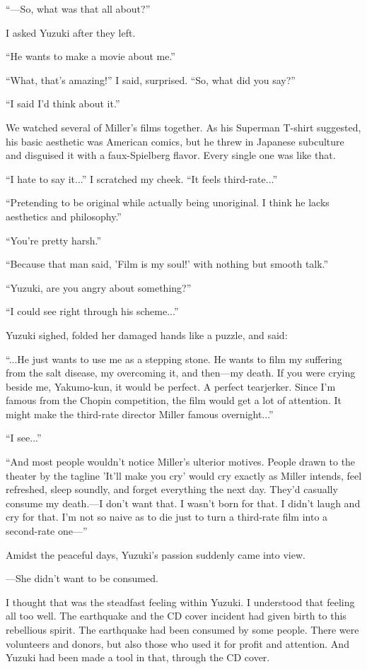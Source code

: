 \documentclass[
    a4paper,
    12pt,
    twoside,
    openany,
    UTF8,
    fontset=windows
]{ctexbook}
\begin{document}
``---So, what was that all about?''

I asked Yuzuki after they left.

``He wants to make a movie about me.''

``What, that's amazing!'' I said, surprised. ``So, what did you say?''

``I said I'd think about it.''

We watched several of Miller's films together. As his Superman T-shirt suggested, his basic aesthetic was American comics, but he threw in Japanese subculture and disguised it with a faux-Spielberg flavor. Every single one was like that.

``I hate to say it...'' I scratched my cheek. ``It feels third-rate...''

``Pretending to be original while actually being unoriginal. I think he lacks aesthetics and philosophy.''

``You're pretty harsh.''

``Because that man said, 'Film is my soul!' with nothing but smooth talk.''

``Yuzuki, are you angry about something?''

``I could see right through his scheme...''

Yuzuki sighed, folded her damaged hands like a puzzle, and said:

``...He just wants to use me as a stepping stone. He wants to film my suffering from the salt disease, my overcoming it, and then---my death. If you were crying beside me, Yakumo-kun, it would be perfect. A perfect tearjerker. Since I'm famous from the Chopin competition, the film would get a lot of attention. It might make the third-rate director Miller famous overnight...''

``I see...''

``And most people wouldn't notice Miller's ulterior motives. People drawn to the theater by the tagline 'It'll make you cry' would cry exactly as Miller intends, feel refreshed, sleep soundly, and forget everything the next day. They'd casually consume my death.---I don't want that. I wasn't born for that. I didn't laugh and cry for that. I'm not so naive as to die just to turn a third-rate film into a second-rate one---''

Amidst the peaceful days, Yuzuki's passion suddenly came into view.

---She didn't want to be consumed.

I thought that was the steadfast feeling within Yuzuki. I understood that feeling all too well. The earthquake and the CD cover incident had given birth to this rebellious spirit. The earthquake had been consumed by some people. There were volunteers and donors, but also those who used it for profit and attention. And Yuzuki had been made a tool in that, through the CD cover.
\end{document}
